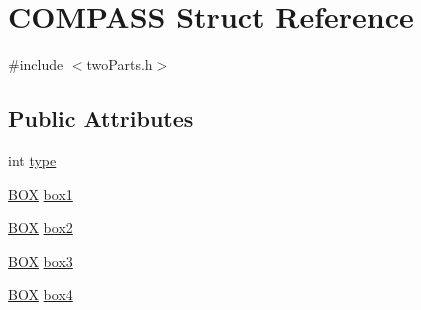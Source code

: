 \hypertarget{struct_c_o_m_p_a_s_s}{\section{C\-O\-M\-P\-A\-S\-S Struct Reference}
\label{struct_c_o_m_p_a_s_s}
}


{\ttfamily \#include $<$two\-Parts.\-h$>$}

\subsection*{Public Attributes}
\begin{DoxyCompactItemize}
\item 
int \hyperlink{struct_c_o_m_p_a_s_s_aac81c604b47f8c0f113235ea9ae5c9fa}{type}
\item 
\hyperlink{struct_b_o_x}{B\-O\-X} \hyperlink{struct_c_o_m_p_a_s_s_a46eacc1577f270f8a15d7a4c96a14c3f}{box1}
\item 
\hyperlink{struct_b_o_x}{B\-O\-X} \hyperlink{struct_c_o_m_p_a_s_s_a776d66ae29a5b410460385dd5b777883}{box2}
\item 
\hyperlink{struct_b_o_x}{B\-O\-X} \hyperlink{struct_c_o_m_p_a_s_s_ac3c28fa36be8eaac8a8f874f0628fe39}{box3}
\item 
\hyperlink{struct_b_o_x}{B\-O\-X} \hyperlink{struct_c_o_m_p_a_s_s_afa0b1be76828772e79a7b75808035476}{box4}
\end{DoxyCompactItemize}


